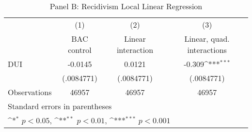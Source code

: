 \begin{table}[htbp]\centering
\def\sym#1{\ifmmode^{#1}\else\(^{#1}\)\fi}
\caption{Panel B: Recidivism Local Linear Regression}
\begin{tabular}{l*{3}{c}}
\hline\hline
                    &\multicolumn{1}{c}{(1)}&\multicolumn{1}{c}{(2)}&\multicolumn{1}{c}{(3)}\\
                    &\multicolumn{1}{c}{BAC control}&\multicolumn{1}{c}{Linear interaction}&\multicolumn{1}{c}{Linear, quad. interactions}\\
\hline
DUI                 &     -0.0145         &      0.0121         &      -0.309\sym{***}\\
                    &  (.0084771)         &  (.0084771)         &  (.0084771)         \\
\hline
Observations        &       46957         &       46957         &       46957         \\
\hline\hline
\multicolumn{4}{l}{\footnotesize Standard errors in parentheses}\\
\multicolumn{4}{l}{\footnotesize \sym{*} \(p<0.05\), \sym{**} \(p<0.01\), \sym{***} \(p<0.001\)}\\
\end{tabular}
\end{table}
